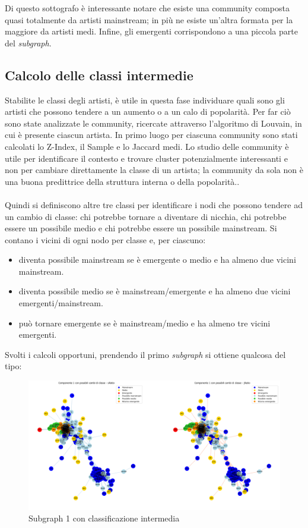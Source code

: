 \documentclass[sigchi]{acmart}
\begin{document}
\noindent Di questo sottografo è interessante notare che esiste una community composta quasi totalmente da artisti mainstream; in più ne esiste un'altra formata per la maggiore da artisti medi. Infine, gli emergenti corrispondono a una piccola parte del {\itshape subgraph}.

\subsection{Calcolo delle classi intermedie}

Stabilite le classi degli artisti, è utile in questa fase individuare quali sono gli artisti che possono tendere a un aumento o a un calo di popolarità. Per far ciò sono state analizzate le community, ricercate attraverso l'algoritmo di Louvain, in cui è presente ciascun artista. In primo luogo per ciascuna community sono stati calcolati lo Z-Index, il Sample e lo Jaccard medi. Lo studio delle community è utile per identificare il contesto e trovare cluster potenzialmente interessanti e non per cambiare direttamente la classe di un artista; la community da sola non è una buona predittrice della struttura interna o della popolarità..
 \\ \\ Quindi si definiscono altre tre classi per identificare i nodi che possono tendere ad un cambio di classe: chi potrebbe tornare a diventare di nicchia, chi potrebbe essere un possibile medio e chi potrebbe essere un possibile mainstream. Si contano i vicini di ogni nodo per classe e, per ciascuno:

\begin{itemize}
\item diventa possibile mainstream se è emergente o medio e ha almeno due vicini mainstream.
\item diventa possibile medio se è mainstream/emergente e ha almeno due vicini emergenti/mainstream.
\item può tornare emergente se è mainstream/medio e ha almeno tre vicini emergenti.
\end{itemize}

Svolti i calcoli opportuni, prendendo il primo {\itshape subgraph} si ottiene qualcosa del tipo:

\begin{figure}[H]
\centering
\includegraphics[width=0.45
\textwidth]{../open_problem/plots/3_3/subClSubgr_1.png}
\caption{Subgraph 1 con classificazione intermedia}
\label{fig:subClSubgr_1}
\end{figure}
\end{document}

